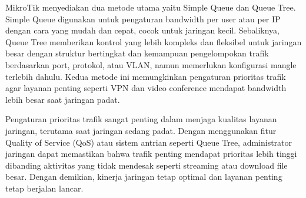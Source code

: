 MikroTik menyediakan dua metode utama yaitu Simple Queue dan Queue 
Tree. Simple Queue digunakan untuk pengaturan bandwidth per user atau per IP dengan cara yang mudah 
dan cepat, cocok untuk jaringan kecil. Sebaliknya, Queue Tree memberikan kontrol yang lebih kompleks 
dan fleksibel untuk jaringan besar dengan struktur bertingkat dan kemampuan pengelompokan trafik 
berdasarkan port, protokol, atau VLAN, namun memerlukan konfigurasi mangle terlebih dahulu. Kedua 
metode ini memungkinkan pengaturan prioritas trafik agar layanan penting seperti VPN dan video 
conference mendapat bandwidth lebih besar saat jaringan padat.

Pengaturan prioritas trafik sangat penting dalam menjaga kualitas layanan jaringan, terutama saat 
jaringan sedang padat. Dengan menggunakan fitur Quality of Service (QoS) atau sistem antrian seperti 
Queue Tree, administrator jaringan dapat memastikan bahwa trafik penting mendapat prioritas lebih 
tinggi dibanding aktivitas yang tidak mendesak seperti streaming atau download file besar. Dengan 
demikian, kinerja jaringan tetap optimal dan layanan penting tetap berjalan lancar.

